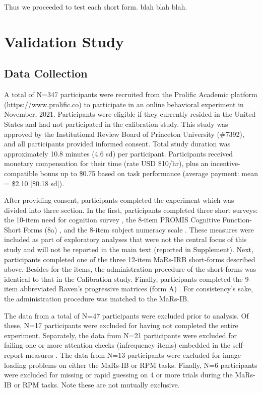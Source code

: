 \documentclass[a4paper,man,natbib]{apa6}
\begin{document}
Thus we proceeded to test each short form. blah blah blah.

\section{Validation Study}

\subsection{Data Collection}

A total of N=347 participants were recruited from the Prolific Academic platform (https://www.prolific.co) to participate in an online behavioral experiment in November, 2021. Participants were eligible if they currently resided in the United States and had not participated in the calibration study. This study was approved by the Institutional Review Board of Princeton University (\#7392), and all participants provided informed consent. Total study duration was approximately 10.8 minutes (4.6 sd) per participant. Participants received monetary compensation for their time (rate USD \$10/hr), plus an incentive-compatible bonus up to \$0.75 based on task performance (average payment: mean = \$2.10 [\$0.18 sd]). 

After providing consent, participants completed the experiment which was divided into three section. In the first, participants completed three short surveys: the 10-item need for cognition survey \citep{chiesi2018applying}, the 8-item PROMIS Cognitive Function-Short Forms (8a) \citep{iverson2021normative}, and the 8-item subject numeracy scale \citep{fagerlin2007measuring}. These measures were included as part of exploratory analyses that were not the central focus of this study and will not be reported in the main text (reported in Supplement). Next, participants completed one of the three 12-item MaRs-IRB short-forms described above. Besides for the items, the administration procedure of the short-forms was identical to that in the Calibration study. Finally, participants completed the 9-item abbreviated Raven's progressive matrices (form A) \citep{bilker2012development}. For consistency's sake, the administration procedure was matched to the MaRs-IB. 

The data from a total of N=47 participants were excluded prior to analysis. Of these, N=17 participants were excluded for having not completed the entire experiment. Separately, the data from N=21 participants were excluded for failing one or more attention checks (infrequency items) embedded in the self-report measures \citep{zorowitz2021inattentive}. The data from N=13 participants were excluded for image loading problems on either the MaRs-IB or RPM tasks. Finally, N=6 participants were excluded for missing or rapid guessing on 4 or more trials during the MaRs-IB or RPM tasks. Note these are not mutually exclusive.
\end{document}
